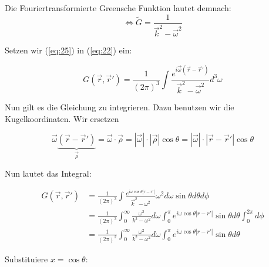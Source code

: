 Die Fouriertransformierte Greensche Funktion lautet demnach:
\begin{equation}
  \label{eq:25}
  \Leftrightarrow \tilde G = \frac{1}{\vec k^2 -\vec \omega^2 }
\end{equation}

Setzen wir (\ref{eq:25}) in (\ref{eq:22}) ein:

\begin{equation}
  \label{eq:26}
  G(\vec r ,\vec r') = \frac{1}{(2\pi)^3}\int  \frac{ e^{i\vec \omega (\vec r -\vec r') }}{\vec k^2 -\vec \omega^2 }  d^3 \omega
\end{equation}


Nun gilt es die Gleichung zu integrieren. Dazu benutzen wir die Kugelkoordinaten. 
Wir ersetzen 


\[\vec \omega \underbrace{(\vec r-\vec r')}_{\vec \rho} = \vec\omega\cdot\vec\rho = |\vec \omega|\cdot|\vec \rho| \cos\theta = |\vec \omega|\cdot|\vec r-\vec r' | \cos\theta \]

Nun lautet das Integral:

\begin{align}
  \label{eq:27}
   G(\vec r ,\vec r') &= \frac{1}{(2\pi)^3} \int \frac{ e^{i\omega \cos\theta|r-r'| }}{\vec k^2 -\omega^2 }  \omega^2d\omega \sin\theta d\theta d\phi \\
&= \frac{1}{(2\pi)^3} \int_0^{\infty} \frac{\omega^2}{k^2 -\omega^2 }  d\omega  \int_0^\pi e^{i\omega \cos\theta|r-r'| }  \sin\theta d\theta \int_0^{2\pi}d\phi \\
&= \frac{1}{(2\pi)^2} \int_0^{\infty} \frac{\omega^2}{k^2 - \omega^2 }  d\omega  \int_0^\pi e^{i\omega \cos\theta|r-r'| }  \sin\theta d\theta 
\end{align}


Substituiere \(x=\cos\theta\):

